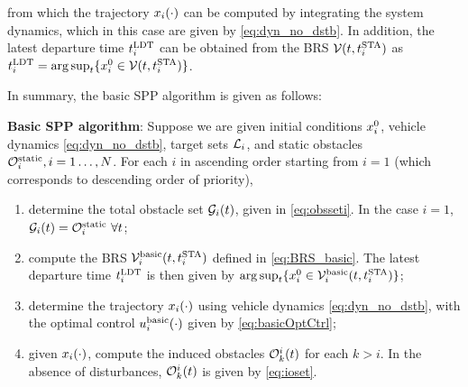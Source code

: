 \noindent from which the trajectory $x_i(\cdot)$ can be computed by integrating the system dynamics, which in this case are given by \eqref{eq:dyn_no_dstb}. In addition, the latest departure time $t^\text{LDT}_i$ can be obtained from the BRS $\mathcal{V}(t, t^\text{STA}_i)$ as $t^\text{LDT}_i = \arg \sup_t \{x_i^0 \in \mathcal{V}(t, t^\text{STA}_i)\}$.

In summary, the basic SPP algorithm is given as follows:

\begin{alg}
\label{alg:basic}
\textbf{Basic SPP algorithm}: Suppose we are given initial conditions $x_i^0$, vehicle dynamics \eqref{eq:dyn_no_dstb}, target sets $\mathcal{L}_i$, and static obstacles $\mathcal{O}^\text{static}_i, i = 1\ldots, N$. For each $i$ in ascending order starting from $i=1$ (which corresponds to descending order of priority),
\begin{enumerate}
\item determine the total obstacle set $\mathcal{G}_i(t)$, given in \eqref{eq:obsseti}. In the case $i=1$, $\mathcal{G}_i(t) = \mathcal{O}^\text{static}_i ~ \forall t$;
\item compute the BRS $\mathcal{V}_i^\text{basic}(t, t^\text{STA}_i)$ defined in \eqref{eq:BRS_basic}. The latest departure time $t^\text{LDT}_i$ is then given by $\arg \sup_t \{x^0_i \in \mathcal{V}_i^\text{basic}(t, t^\text{STA}_i)\}$;
\item determine the trajectory $x_i(\cdot)$ using vehicle dynamics \eqref{eq:dyn_no_dstb}, with the optimal control  $u_i^\text{basic}(\cdot)$ given by \eqref{eq:basicOptCtrl};
\item given $x_i(\cdot)$, compute the induced obstacles $\mathcal{O}_k^i(t)$ for each $k>i$. In the absence of disturbances, $\mathcal{O}_k^i(t)$ is given by \eqref{eq:ioset}.
\end{enumerate}
\end{alg}